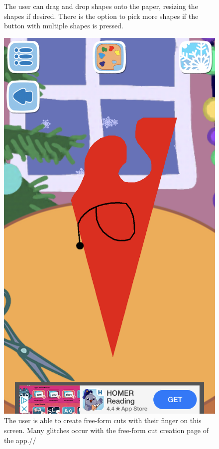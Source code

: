 \documentclass[11pt]{article}
\begin{document}
\begin{figure}[!ht]
\begin{minipage}{0.32\textwidth}
                            \caption{The user can drag and drop shapes onto the paper, resizing the shapes if desired. There is the option to pick more shapes if the button with multiple shapes is pressed.}
                            \label{fig:peppaShapes}
                        \end{minipage}
                        \begin{minipage}{0.32\textwidth}
                            \centering
                            \includegraphics[width=0.8\linewidth]{Images/peppa/peppaFreeFormCut.PNG}
                             \caption{The user is able to create free-form cuts with their finger on this screen. Many glitches occur with the free-form cut creation page of the app.//}
                            \label{fig:peppaFreeFormCut}
                        \end{minipage}

\end{figure}
\end{document}
